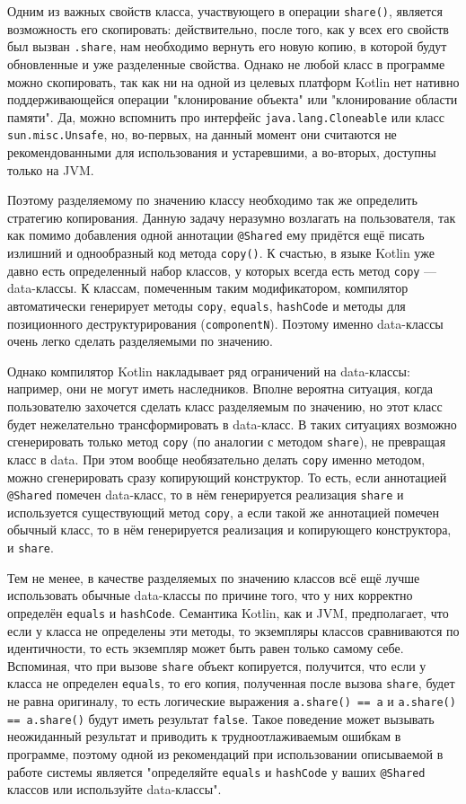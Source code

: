 \documentclass[specification,annotation,times]{itmo-student-thesis}
\begin{document}
Одним из важных свойств класса, участвующего в операции \texttt{share()}, является возможность его скопировать: действительно, после того, как у всех его свойств был вызван \texttt{.share}, нам необходимо вернуть его новую копию, в которой будут обновленные и уже разделенные свойства.
Однако не любой класс в программе можно скопировать, так как ни на одной из целевых платформ Kotlin нет нативно поддерживающейся операции "клонирование объекта" или "клонирование области памяти". Да, можно вспомнить про интерфейс \texttt{java.lang.Cloneable} или класс \texttt{sun.misc.Unsafe}, но, во-первых, на данный момент они считаются не рекомендованными для использования и устаревшими, а во-вторых, доступны только на JVM.

Поэтому разделяемому по значению классу необходимо так же определить стратегию копирования. Данную задачу неразумно возлагать на пользователя, так как помимо добавления одной аннотации \texttt{@Shared} ему придётся ещё писать излишний и однообразный код метода \texttt{copy()}.
К счастью, в языке Kotlin уже давно есть определенный набор классов, у которых всегда есть метод \texttt{copy} --- data-классы. К классам, помеченным таким модификатором, компилятор автоматически генерирует методы \texttt{copy}, \texttt{equals}, \texttt{hashCode} и методы для позиционного деструктурирования (\texttt{componentN}).
Поэтому именно data-классы очень легко сделать разделяемыми по значению.

Однако компилятор Kotlin накладывает ряд ограничений на data-классы: например, они не могут иметь наследников. Вполне вероятна ситуация, когда пользователю захочется сделать класс разделяемым по значению, но этот класс будет нежелательно трансформировать в data-класс.
В таких ситуациях возможно сгенерировать только метод \texttt{copy} (по аналогии с методом \texttt{share}), не превращая класс в data.
При этом вообще необязательно делать \texttt{copy} именно методом, можно сгенерировать сразу копирующий конструктор.
То есть, если аннотацией \texttt{@Shared} помечен data-класс, то в нём генерируется реализация \texttt{share} и используется существующий метод \texttt{copy}, а если такой же аннотацией помечен обычный класс, то в нём генерируется реализация и копирующего конструктора, и \texttt{share}.

Тем не менее, в качестве разделяемых по значению классов всё ещё лучше использовать обычные data-классы по причине того, что у них корректно определён \texttt{equals} и \texttt{hashCode}. Семантика Kotlin, как и JVM, предполагает, что если у класса не определены эти методы, то экземпляры классов сравниваются по идентичности, то есть экземпляр может быть равен только самому себе.
Вспоминая, что при вызове \texttt{share} объект копируется, получится, что если у класса не определен \texttt{equals}, то его копия, полученная после вызова \texttt{share}, будет не равна оригиналу, то есть логические выражения \texttt{a.share() == a} и \texttt{a.share() == a.share()} будут иметь результат \texttt{false}.
Такое поведение может вызывать неожиданный результат и приводить к трудноотлаживаемым ошибкам в программе, поэтому одной из рекомендаций при использовании описываемой в работе системы является "определяйте \texttt{equals} и \texttt{hashCode} у ваших \texttt{@Shared} классов или используйте data-классы".
\end{document}
